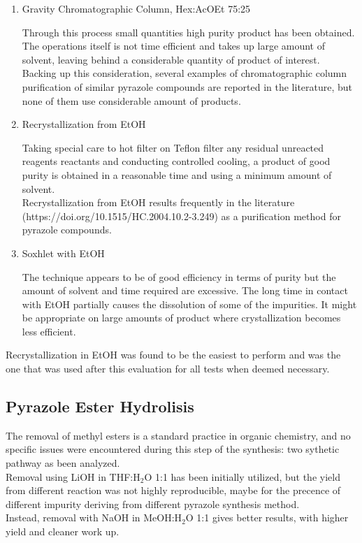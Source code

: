 \documentclass[../Master.tex]{subfiles}
\begin{document}
\begin{enumerate}
	\item  Gravity Chromatographic Column, Hex:AcOEt 75:25

	      Through this process small quantities high purity product has been obtained. The operations itself is not time efficient and takes up large amount of solvent, leaving behind a considerable quantity of product of interest.\\
	      Backing up this consideration, several examples of chromatographic column purification of similar pyrazole compounds are reported in the literature, but none of them use considerable amount of products.
	\item Recrystallization from EtOH

	      Taking special care to hot filter on Teflon filter any residual unreacted reagents reactants and conducting controlled cooling, a product of good purity is obtained in a reasonable time and using a minimum amount of solvent. \\
	      Recrystallization from EtOH results frequently in the literature (https://doi.org/10.1515/HC.2004.10.2-3.249) as a purification method for pyrazole compounds.
	\item Soxhlet with EtOH

	      The technique appears to be of good efficiency in terms of purity but the amount of solvent and time required are excessive. The long time in contact with EtOH partially causes the dissolution of some of the impurities. It might be appropriate on large amounts of product where
	      crystallization becomes less efficient.
\end{enumerate}

Recrystallization in EtOH was found to be the easiest to perform and was the one that was used after this evaluation for all tests when deemed necessary.

\subsection{Pyrazole Ester Hydrolisis}\label{sec:pyrazole-hydro}

The removal of methyl esters is a standard practice in organic chemistry, and no specific issues were encountered during this step of the synthesis: two sythetic pathway as been analyzed.\\
Removal using LiOH in THF:H$_2$O 1:1 has been initially utilized, but the yield from different reaction was not highly reproducible, maybe for the precence of different impurity deriving from different pyrazole synthesis method.\\
Instead, removal with NaOH in MeOH:H$_{2}$O 1:1 gives better results, with higher yield and cleaner work up.
\end{document}
